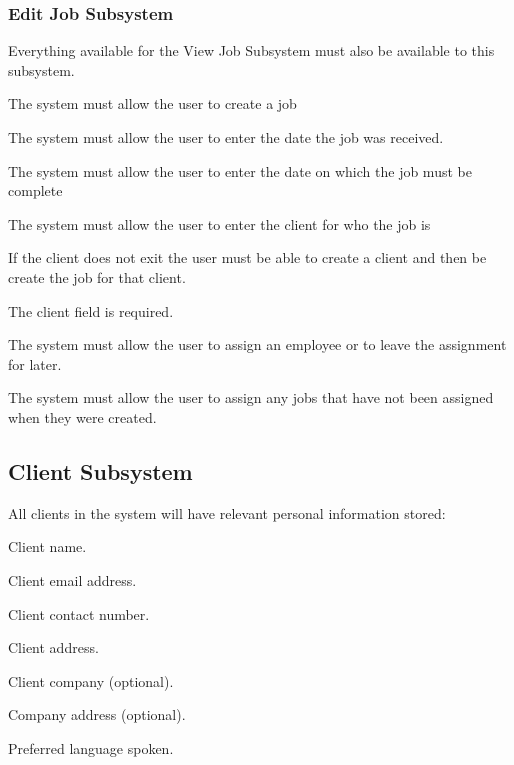 \documentclass{article}
\begin{document}
	
	
	\subsubsection*{Edit Job Subsystem}	
	\begin{list}{R.}{}
		\item Everything available for the View Job Subsystem must also be available to this subsystem.
		\item The system must allow the user to create a job
		\begin{list}{R.}{}
			\item The system must allow the user to enter the date the job was received.
			\item The system must allow the user to enter the date on which the job must be complete 
			\item The system must allow the user to enter the client for who the job is
			\begin{list}{R..}{}
				\item If the client does not exit the user must be able to create a client and then be create the job for that client.
				\item The client field is required.
			\end{list}
			\item The system must allow the user to assign an employee or to leave the assignment for later.
		\end{list}
		\item The system must allow the user to assign any jobs that have not been assigned when they were created.
		
	\end{list}
	
	
	
	\subsection*{Client Subsystem}	
	\begin{list}{R.}{}
		\item All clients in the system will have relevant personal information stored:
		\begin{list}{R.}{}
			\item Client name.
			\item Client email address.
			\item Client contact number.
			\item Client address.
			\item Client company (optional).
			\item Company address (optional).
			\item Preferred language spoken.
		\end{list}
	\end{list}
\end{document}
